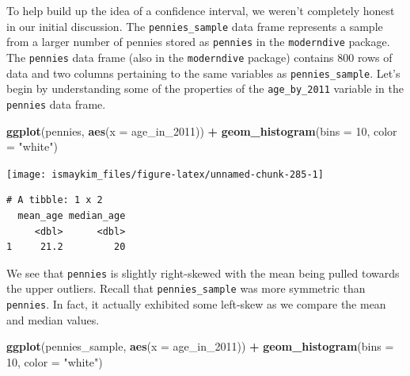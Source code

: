 \documentclass[12pt, krantz2,]{krantz}
\makeatletter
\newenvironment{Shaded}{\begin{snugshade}}{\end{snugshade}}
\newcommand{\DataTypeTok}[1]{\textcolor[rgb]{0.27,0.27,0.27}{#1}}
\newcommand{\DecValTok}[1]{\textcolor[rgb]{0.06,0.06,0.06}{#1}}
\newcommand{\KeywordTok}[1]{\textcolor[rgb]{0.27,0.27,0.27}{\textbf{#1}}}
\newcommand{\NormalTok}[1]{#1}
\newcommand{\OperatorTok}[1]{\textcolor[rgb]{0.43,0.43,0.43}{\textbf{#1}}}
\newcommand{\StringTok}[1]{\textcolor[rgb]{0.5,0.5,0.5}{#1}}
\newenvironment{kframe}{%
\medskip{}
\setlength{\fboxsep}{.8em}
 \def\at@end@of@kframe{}%
 \ifinner\ifhmode%
  \def\at@end@of@kframe{\end{minipage}}%
  \begin{minipage}{\columnwidth}%
 \fi\fi%
 \def\FrameCommand##1{\hskip\@totalleftmargin \hskip-\fboxsep
 \colorbox{shadecolor}{##1}\hskip-\fboxsep
     \hskip-\linewidth \hskip-\@totalleftmargin \hskip\columnwidth}%
 \MakeFramed {\advance\hsize-\width
   \@totalleftmargin\z@ \linewidth\hsize
   \@setminipage}}%
 {\par\unskip\endMakeFramed%
 \at@end@of@kframe}
\renewenvironment{Shaded}{\begin{kframe}}{\end{kframe}}
\makeatother
\begin{document}
To help build up the idea of a confidence interval, we weren't completely honest in our initial discussion. The \texttt{pennies\_sample} data frame represents a sample from a larger number of pennies stored as \texttt{pennies} in the \texttt{moderndive} package. The \texttt{pennies} data frame (also in the \texttt{moderndive} package) contains 800 rows of data and two columns pertaining to the same variables as \texttt{pennies\_sample}. Let's begin by understanding some of the properties of the \texttt{age\_by\_2011} variable in the \texttt{pennies} data frame.

\begin{Shaded}
\begin{Highlighting}[]
\KeywordTok{ggplot}\NormalTok{(pennies, }\KeywordTok{aes}\NormalTok{(}\DataTypeTok{x =}\NormalTok{ age_in_}\DecValTok{2011}\NormalTok{)) }\OperatorTok{+}
\StringTok{  }\KeywordTok{geom_histogram}\NormalTok{(}\DataTypeTok{bins =} \DecValTok{10}\NormalTok{, }\DataTypeTok{color =} \StringTok{"white"}\NormalTok{)}
\end{Highlighting}
\end{Shaded}

\begin{center}\texttt{[image: ismaykim\_files/figure-latex/unnamed-chunk-285-1]} \end{center}

\begin{Shaded}
\end{Shaded}

\begin{verbatim}
# A tibble: 1 x 2
  mean_age median_age
     <dbl>      <dbl>
1     21.2         20
\end{verbatim}

We see that \texttt{pennies} is slightly right-skewed with the mean being pulled towards the upper outliers. Recall that \texttt{pennies\_sample} was more symmetric than \texttt{pennies}. In fact, it actually exhibited some left-skew as we compare the mean and median values.

\begin{Shaded}
\begin{Highlighting}[]
\KeywordTok{ggplot}\NormalTok{(pennies_sample, }\KeywordTok{aes}\NormalTok{(}\DataTypeTok{x =}\NormalTok{ age_in_}\DecValTok{2011}\NormalTok{)) }\OperatorTok{+}
\StringTok{  }\KeywordTok{geom_histogram}\NormalTok{(}\DataTypeTok{bins =} \DecValTok{10}\NormalTok{, }\DataTypeTok{color =} \StringTok{"white"}\NormalTok{)}
\end{Highlighting}
\end{Shaded}
\end{document}
